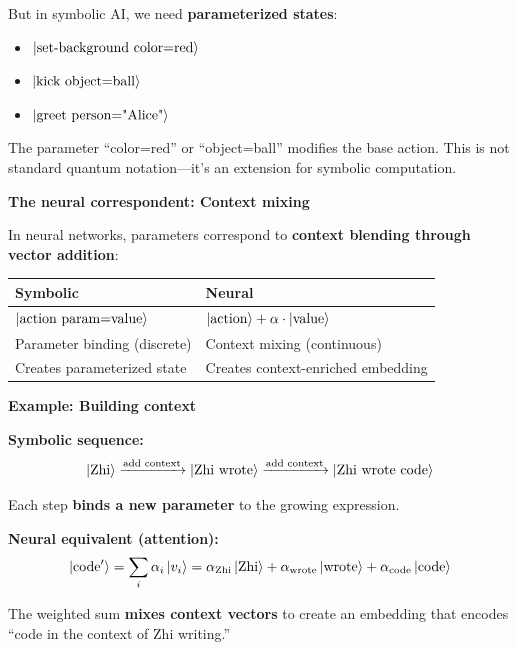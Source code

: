 \documentclass[11pt,a4paper]{article}
\theoremstyle{definition}
\begin{document}
But in symbolic AI, we need \textbf{parameterized states}:
\begin{itemize}
\item $\ket{\text{set-background color=red}}$
\item $\ket{\text{kick object=ball}}$
\item $\ket{\text{greet person="Alice"}}$
\end{itemize}

The parameter ``color=red'' or ``object=ball'' modifies the base action. This is not standard quantum notation---it's an extension for symbolic computation.

\textbf{The neural correspondent: Context mixing}

In neural networks, parameters correspond to \textbf{context blending through vector addition}:

\begin{table}[h]
\centering
\begin{tabular}{ll}
\toprule
\textbf{Symbolic} & \textbf{Neural} \\
\midrule
$\ket{\text{action param=value}}$ & $\ket{\text{action}} + \alpha \cdot \ket{\text{value}}$ \\
Parameter binding (discrete) & Context mixing (continuous) \\
Creates parameterized state & Creates context-enriched embedding \\
\bottomrule
\end{tabular}
\end{table}

\textbf{Example: Building context}

\textbf{Symbolic sequence:}
\begin{equation}
\ket{\text{Zhi}} \xrightarrow{\text{add context}} \ket{\text{Zhi wrote}} \xrightarrow{\text{add context}} \ket{\text{Zhi wrote code}}
\end{equation}

Each step \textbf{binds a new parameter} to the growing expression.

\textbf{Neural equivalent (attention):}
\begin{equation}
\ket{\text{code}'} = \sum_i \alpha_i \ket{v_i} = \alpha_{\text{Zhi}} \ket{\text{Zhi}} + \alpha_{\text{wrote}} \ket{\text{wrote}} + \alpha_{\text{code}} \ket{\text{code}}
\end{equation}

The weighted sum \textbf{mixes context vectors} to create an embedding that encodes ``code in the context of Zhi writing.''
\end{document}
